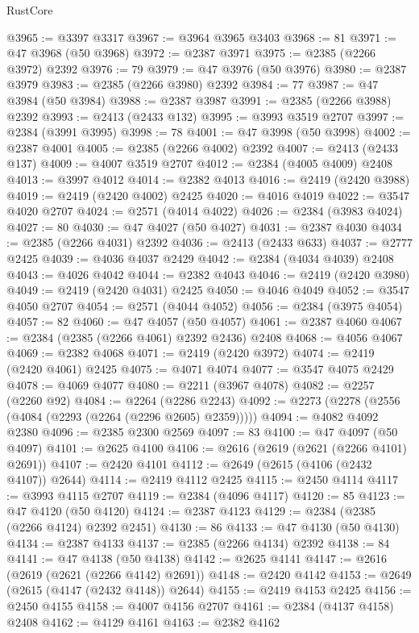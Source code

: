 \begin{lexlean}{RustCore}
\begin{coremodule}
@3965 := @3397 @3317
@3967 := @3964 @3965 @3403
@3968 := 81
@3971 := @47 @3968 (@50 @3968)
@3972 := @2387 @3971
@3975 := @2385 (@2266 @3972) @2392
@3976 := 79
@3979 := @47 @3976 (@50 @3976)
@3980 := @2387 @3979
@3983 := @2385 (@2266 @3980) @2392
@3984 := 77
@3987 := @47 @3984 (@50 @3984)
@3988 := @2387 @3987
@3991 := @2385 (@2266 @3988) @2392
@3993 := @2413 (@2433 @132)
@3995 := @3993 @3519 @2707
@3997 := @2384 (@3991 @3995)
@3998 := 78
@4001 := @47 @3998 (@50 @3998)
@4002 := @2387 @4001
@4005 := @2385 (@2266 @4002) @2392
@4007 := @2413 (@2433 @137)
@4009 := @4007 @3519 @2707
@4012 := @2384 (@4005 @4009) @2408
@4013 := @3997 @4012
@4014 := @2382 @4013
@4016 := @2419 (@2420 @3988)
@4019 := @2419 (@2420 @4002) @2425
@4020 := @4016 @4019
@4022 := @3547 @4020 @2707
@4024 := @2571 (@4014 @4022)
@4026 := @2384 (@3983 @4024)
@4027 := 80
@4030 := @47 @4027 (@50 @4027)
@4031 := @2387 @4030
@4034 := @2385 (@2266 @4031) @2392
@4036 := @2413 (@2433 @633)
@4037 := @2777 @2425
@4039 := @4036 @4037 @2429
@4042 := @2384 (@4034 @4039) @2408
@4043 := @4026 @4042
@4044 := @2382 @4043
@4046 := @2419 (@2420 @3980)
@4049 := @2419 (@2420 @4031) @2425
@4050 := @4046 @4049
@4052 := @3547 @4050 @2707
@4054 := @2571 (@4044 @4052)
@4056 := @2384 (@3975 @4054)
@4057 := 82
@4060 := @47 @4057 (@50 @4057)
@4061 := @2387 @4060
@4067 := @2384 (@2385 (@2266 @4061) @2392 @2436) @2408
@4068 := @4056 @4067
@4069 := @2382 @4068
@4071 := @2419 (@2420 @3972)
@4074 := @2419 (@2420 @4061) @2425
@4075 := @4071 @4074
@4077 := @3547 @4075 @2429
@4078 := @4069 @4077
@4080 := @2211 (@3967 @4078)
@4082 := @2257 (@2260 @92)
@4084 := @2264 (@2286 @2243)
@4092 := @2273 (@2278 (@2556 (@4084 (@2293 (@2264 (@2296 @2605) @2359)))))
@4094 := @4082 @4092 @2380
@4096 := @2385 @2300 @2569
@4097 := 83
@4100 := @47 @4097 (@50 @4097)
@4101 := @2625 @4100
@4106 := @2616 (@2619 (@2621 (@2266 @4101) @2691))
@4107 := @2420 @4101
@4112 := @2649 (@2615 (@4106 (@2432 @4107)) @2644)
@4114 := @2419 @4112 @2425
@4115 := @2450 @4114
@4117 := @3993 @4115 @2707
@4119 := @2384 (@4096 @4117)
@4120 := 85
@4123 := @47 @4120 (@50 @4120)
@4124 := @2387 @4123
@4129 := @2384 (@2385 (@2266 @4124) @2392 @2451)
@4130 := 86
@4133 := @47 @4130 (@50 @4130)
@4134 := @2387 @4133
@4137 := @2385 (@2266 @4134) @2392
@4138 := 84
@4141 := @47 @4138 (@50 @4138)
@4142 := @2625 @4141
@4147 := @2616 (@2619 (@2621 (@2266 @4142) @2691))
@4148 := @2420 @4142
@4153 := @2649 (@2615 (@4147 (@2432 @4148)) @2644)
@4155 := @2419 @4153 @2425
@4156 := @2450 @4155
@4158 := @4007 @4156 @2707
@4161 := @2384 (@4137 @4158) @2408
@4162 := @4129 @4161
@4163 := @2382 @4162

\end{coremodule}
\end{lexlean}
